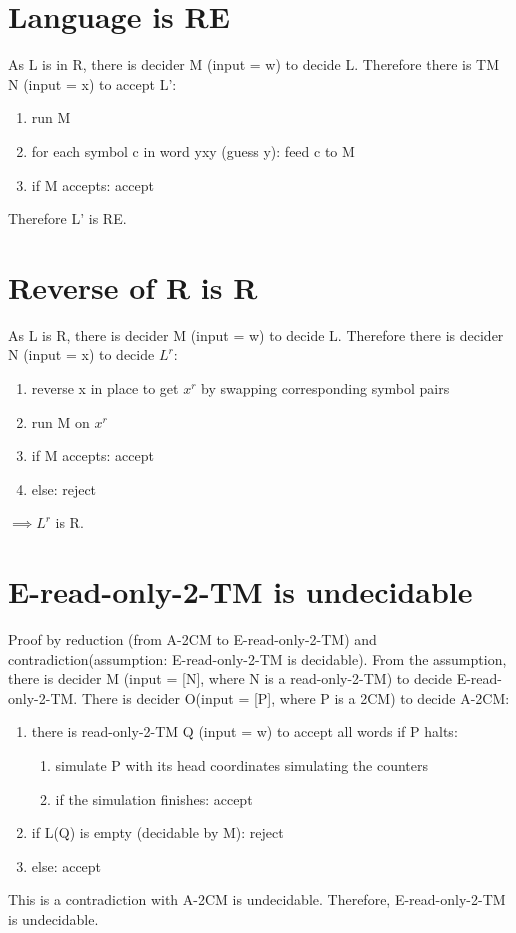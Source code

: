 \documentclass{article}
\begin{document}
\section{Language is RE}
As L is in R, there is decider M (input = w) to decide L. 
Therefore there is TM N (input = x) to accept L':
\begin{enumerate}
	\item run M
	\item for each symbol c in word yxy (guess y): feed c to M
	\item if M accepts: accept
\end{enumerate}
Therefore L' is RE.

\section{Reverse of R is R}
As L is R, there is decider M (input = w) to decide L.
Therefore there is decider N (input = x) to decide $ L^r $:
\begin{enumerate}
	\item reverse x in place to get $ x^r $ by swapping corresponding symbol pairs
	\item run M on $ x^r $
	\item if M accepts: accept
	\item else: reject
\end{enumerate}
$ \implies L^r $ is R.

\section{E-read-only-2-TM is undecidable}
Proof by reduction (from A-2CM to E-read-only-2-TM) and 
contradiction(assumption: E-read-only-2-TM is decidable).
From the assumption, there is decider M (input = [N], where N is a 
read-only-2-TM) to decide E-read-only-2-TM.
There is decider O(input = [P], where P is a 2CM) to decide A-2CM:
\begin{enumerate}
	\item there is read-only-2-TM Q (input = w) to accept all words if P halts:
	\begin{enumerate}
		\item simulate P with its head coordinates simulating the counters
		\item if the simulation finishes: accept
	\end{enumerate}
	\item if L(Q) is empty (decidable by M): reject
	\item else: accept
\end{enumerate}
This is a contradiction with A-2CM is undecidable. Therefore, E-read-only-2-TM is undecidable.
\end{document}

